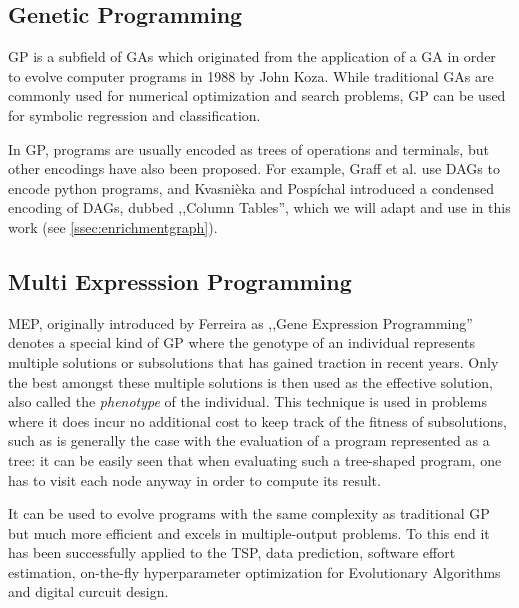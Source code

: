 \newpage
\subsection{Genetic Programming}
\label{ssec:gp}

\acf{GP} is a subfield of \aclp{GA} which originated from the application of a \ac{GA} in order to evolve computer programs in 1988 by John Koza\cite{koza:1990a}.
While traditional \acp{GA} are commonly used for numerical optimization and search problems, \ac{GP} can be used for symbolic regression and classification.

In \acl{GP}, programs are usually encoded as trees of operations and terminals, but other encodings have also been proposed.
For example, Graff et al.\cite{graff:2016a} use \acp{DAG} to encode python programs, and Kvasnièka and Pospíchal\cite{kvasnieka:1998a} introduced a condensed encoding of \acp{DAG}, dubbed ,,Column Tables'', which we will adapt and use in this work (see \autoref{ssec:enrichmentgraph}).



\subsection{Multi Expresssion Programming}
\label{ssec:mep}

\acf{MEP}, originally introduced by Ferreira\cite{ferreira:cs2001a} as ,,Gene Expression Programming'' denotes a special kind of \acl{GP} where the genotype of an individual represents multiple solutions or subsolutions that has gained traction in recent years.
Only the best amongst these multiple solutions is then used as the effective solution, also called the \emph{phenotype} of the individual.
This technique is used in problems where it does incur no additional cost to keep track of the fitness of subsolutions, such as is generally the case with the evaluation of a program represented as a tree: it can be easily seen that when evaluating such a tree-shaped program, one has to visit each node anyway in order to compute its result.

It can be used to evolve programs with the same complexity as traditional \ac{GP} but much more efficient and excels in multiple-output problems.
To this end it has been successfully applied to the TSP\cite{oltean:c2015a}, data prediction\cite{zhang:i2013a}, 
software effort estimation\cite{akram:c2018a}, on-the-fly hyperparameter optimization for Evolutionary Algorithms\cite{oltean:2003a} and digital curcuit design\cite{oltean:2004b}.

